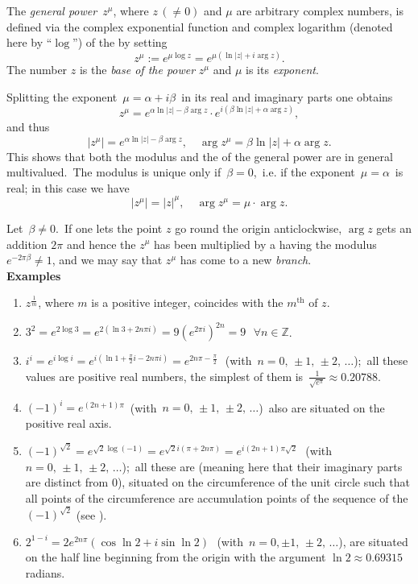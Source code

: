 \documentclass[12pt]{article}
\begin{document}
The {\em general power}\, $z^\mu$, where $z\,(\neq 0)$ and $\mu$ are arbitrary complex numbers, is defined via the complex exponential function and complex logarithm (denoted here by ``$\log$'') of the  by setting
$$z^\mu := e^{\mu\log{z}} = e^{\mu(\ln{|z|}\!+\!i\arg{z})}.$$
The number $z$ is the {\em base of the power} $z^\mu$ and $\mu$ is its {\em exponent}.

Splitting the exponent\, $\mu = \alpha+i\beta$\, in its real and imaginary parts one obtains
$$z^\mu = e^{\alpha\ln{|z|}-\beta\arg{z}}\cdot e^{i(\beta\ln{|z|}+\alpha\arg{z})},$$
and thus
$$|z^\mu| =e^{\alpha\ln{|z|}-\beta\arg{z}}, 
          \quad \arg{z^\mu} = \beta\ln{|z|}\!+\!\alpha\arg{z}.$$
This shows that both the modulus and the  of the general power are in general multivalued.\, The modulus is unique only if\, $\beta = 0$,\, i.e. if the exponent\, $\mu = \alpha$\, is real; in this case we have
$$|z^\mu| = |z|^\mu, \quad \arg{z^\mu} = \mu\cdot\arg{z}.$$

Let\, $\beta \neq 0$.\, If one lets the point $z$ go round the origin anticlockwise, $\arg{z}$ gets an addition $2\pi$ and hence the  $z^\mu$ has been multiplied by a  having the modulus\, $e^{-2\pi\beta} \neq 1$, and we may say that $z^\mu$ has come to a new {\em branch}.\\


\textbf{Examples}
\begin{enumerate}
\item $z^{\frac{1}{m}}$, where $m$ is a positive integer, coincides with the $m^\mathrm{th}$  of $z$.
\item $\displaystyle 3^2 = e^{2\log{3}} = e^{2(\ln{3}+2n\pi i)} = 9(e^{2\pi i})^{2n} = 9$\,\,
  $\forall n\in\mathbb{Z}$.
\item $\displaystyle i^i = e^{i\log{i}} = e^{i(\ln{1}+\frac{\pi}{2}i-2n\pi i)} =
  e^{2n\pi-\frac{\pi}{2}}$\,\, (with\, $n = 0,\,\pm1,\,\pm2,\,\ldots$);\, all these values are positive real numbers, the simplest of them is\, $\displaystyle\frac{1}{\sqrt{e^\pi}} \approx 0.20788$.
\item $(-1)^i = e^{(2n+1)\pi}$\, (with\, $n = 0,\,\pm1,\,\pm2,\,\ldots$)\, also are situated on the positive real axis.
\item $\displaystyle (-1)^{\sqrt{2}} = e^{\sqrt{2}\log{(-1)}} = 
  e^{\sqrt{2}i(\pi+2n\pi)} = e^{i(2n+1)\pi\sqrt{2}}$\,\, (with\, 
$n = 0,\,\pm1,\,\pm2,\,\ldots$);\, all these are  (meaning here that their imaginary parts are distinct from 0), situated on the circumference of the unit circle such that all points of the circumference are accumulation points of the sequence of the  $\displaystyle (-1)^{\sqrt{2}}$ (see ). 
\item $2^{1-i} = 2e^{2n\pi}(\cos\ln{2}+i\sin\ln{2})$\,\, (with\, $n = 0,\pm1,\,\pm2,\,\ldots$), are situated on the half line beginning from the origin with the argument $\ln{2} \approx 0.69315$ radians.
\end{enumerate}
\end{document}
